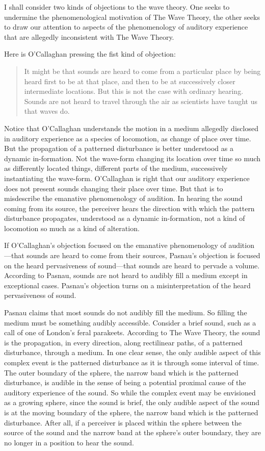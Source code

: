 \documentclass[12pt]{article}
\begin{document}
I shall consider two kinds of objections to the wave theory. One seeks to undermine the phenomenological motivation of The Wave Theory, the other seeks to draw our attention to aspects of the phenomenology of auditory experience that are allegedly inconsistent with The Wave Theory.

Here is O’Callaghan pressing the fist kind of objection:
\begin{quote}
	It might be that sounds are heard to come from a particular place by being heard first to be at that place, and then to be at successively closer intermediate locations. But this is not the case with ordinary hearing. Sounds are not heard to travel through the air as scientists have taught us that waves do. \citep[34]{OCallaghan:2007xy}
\end{quote}
Notice that O’Callaghan understands the motion in a medium allegedly disclosed in auditory experience as a species of locomotion, as change of place over time. But the propagation of a patterned disturbance is better understood as a dynamic in-formation. Not the wave-form changing its location over time so much as differently located things, different parts of the medium, successively instantiating the wave-form. O'Callaghan is right that our auditory experience does not present sounds changing their place over time. But that is to misdescribe the emanative phenomenology of audition. In hearing the sound coming from its source, the perceiver hears the direction with which the pattern disturbance propagates, understood as a dynamic in-formation, not a kind of locomotion so much as a kind of alteration.

If O’Callaghan’s objection focused on the emanative phenomenology of audition---that sounds are heard to come from their sources, Pasnau’s objection is focused on the heard pervasiveness of sound---that sounds are heard to pervade a volume. According to Pasnau, sounds are not heard to audibly fill a medium except in exceptional cases. Pasnau's objection turns on a misinterpretation of the heard pervasiveness of sound.

Pasnau claims that most sounds do not audibly fill the medium. So filling the medium must be something audibly accessible. Consider a brief sound, such as a call of one of London's feral parakeets. According to The Wave Theory, the sound is the propagation, in every direction, along rectilinear paths, of a patterned disturbance, through a medium. In one clear sense, the only audible aspect of this complex event is the patterned disturbance as it is through some interval of time. The outer boundary of the sphere, the narrow band which is the patterned disturbance, is audible in the sense of being a potential proximal cause of the auditory experience of the sound. So while the complex event may be envisioned as a growing sphere, since the sound is brief, the only audible aspect of the sound is at the moving boundary of the sphere, the narrow band which is the patterned disturbance. After all, if a perceiver is placed within the sphere between the source of the sound and the narrow band at the sphere's outer boundary, they are no longer in a position to hear the sound. 
\end{document}
